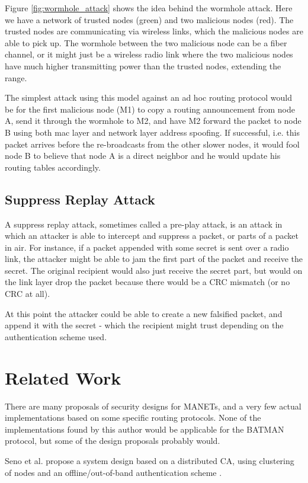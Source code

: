 Figure \ref{fig:wormhole_attack} shows the idea behind the wormhole attack. Here
we have a network of trusted nodes (green) and two malicious nodes (red). The
trusted nodes are communicating via wireless links, which the malicious nodes
are able to pick up. The wormhole between the two malicious node can be a fiber
channel, or it might just be a wireless radio link where the two malicious nodes
have much higher transmitting power than the trusted nodes, extending the range.

The simplest attack using this model against an ad hoc routing protocol would be
for the first malicious node (M1) to copy a routing announcement from node A,
send it through the wormhole to M2, and have M2 forward the packet to node B
using both mac layer and network layer address spoofing. If successful, i.e.
this packet arrives before the re-broadcasts from the other slower nodes, it
would fool node B to believe that node A is a direct neighbor and he would
update his routing tables accordingly.

\subsection{Suppress Replay Attack}
A suppress replay attack, sometimes called a pre-play attack, is an attack in
which an attacker is able to intercept and suppress a packet, or parts of a
packet in air. For instance, if a packet appended with some secret is sent over
a radio link, the attacker might be able to jam the first part of the packet and
receive the secret. The original recipient would also just receive the secret
part, but would on the link layer drop the packet because there would be a
\ac{CRC} mismatch (or no \ac{CRC} at all).

At this point the attacker could be able to create a new falsified packet, and
append it with the secret - which the recipient might trust depending on the
authentication scheme used.

\section{Related Work}
There are many proposals of security designs for \acp{MANET}, and a very few
actual implementations based on some specific routing protocols. None of the
implementations found by this author would be applicable for the BATMAN
protocol, but some of the design proposals probably would.

Seno et al. propose a system design based on a distributed CA, using clustering
of nodes and an offline/out-of-band authentication scheme \cite{hosseinisecure}.

